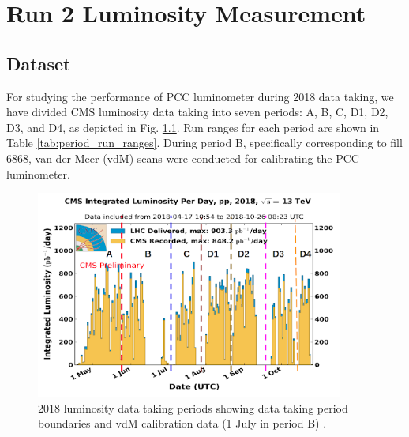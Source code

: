 \chapter{Run 2 Luminosity Measurement}  %

\ifpdf
    \graphicspath{{Chapter4/Figs/Raster/}{Chapter4/Figs/PDF/}{Chapter4/Figs/}}
\else
    \graphicspath{{Chapter4/Figs/Vector/}{Chapter4/Figs/}}
\fi




\section{Dataset}

For studying the performance of PCC luminometer during 2018 data taking, we have divided CMS luminosity data taking into seven periods: A, B, C, D1, D2, D3, and D4, as depicted in %
Fig. \ref{fig:period_bound}. Run ranges for each period are shown in Table \ref{tab:period_run_ranges}.
During period B, specifically corresponding to fill 6868, van der Meer (vdM) scans were conducted for calibrating the PCC luminometer.

\begin{figure}[!htp]
\centering
\includegraphics[width=0.9\textwidth]{ashish_thesis/period_boundary.png}
\caption[2018 CMS luminosity data period]{%
   2018 luminosity data taking periods showing data taking period boundaries and vdM calibration data (1 July in period B)  \cite{CERNLumiPublicResults}.
}
\label{fig:period_bound}
\end{figure}


